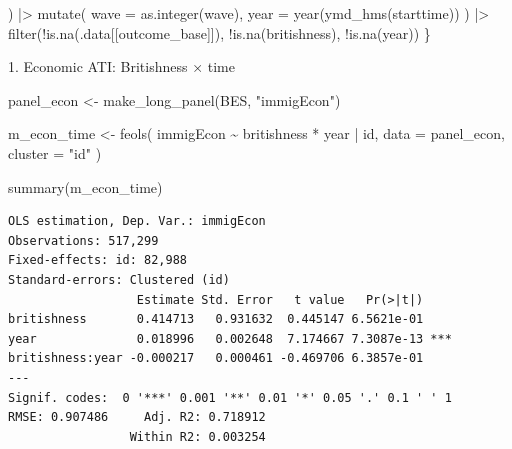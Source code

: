 \documentclass[
  11pt,
  letterpaper,
  DIV=11,
  numbers=noendperiod]{scrartcl}
\newenvironment{Shaded}{\begin{snugshade}}{\end{snugshade}}
\newcommand{\AttributeTok}[1]{\textcolor[rgb]{0.40,0.45,0.13}{#1}}
\newcommand{\FunctionTok}[1]{\textcolor[rgb]{0.28,0.35,0.67}{#1}}
\newcommand{\NormalTok}[1]{\textcolor[rgb]{0.00,0.23,0.31}{#1}}
\newcommand{\OtherTok}[1]{\textcolor[rgb]{0.00,0.23,0.31}{#1}}
\newcommand{\SpecialCharTok}[1]{\textcolor[rgb]{0.37,0.37,0.37}{#1}}
\newcommand{\StringTok}[1]{\textcolor[rgb]{0.13,0.47,0.30}{#1}}
\begin{document}
\begin{Shaded}
\begin{Highlighting}[]
\NormalTok{) }\SpecialCharTok{|\textgreater{}}
\FunctionTok{mutate}\NormalTok{(}
\AttributeTok{wave =} \FunctionTok{as.integer}\NormalTok{(wave),}
\AttributeTok{year =} \FunctionTok{year}\NormalTok{(}\FunctionTok{ymd\_hms}\NormalTok{(starttime))}
\NormalTok{) }\SpecialCharTok{|\textgreater{}}
\FunctionTok{filter}\NormalTok{(}\SpecialCharTok{!}\FunctionTok{is.na}\NormalTok{(.data[[outcome\_base]]),}
\SpecialCharTok{!}\FunctionTok{is.na}\NormalTok{(britishness),}
\SpecialCharTok{!}\FunctionTok{is.na}\NormalTok{(year))}
\NormalTok{\}}
\end{Highlighting}
\end{Shaded}

1. Economic ATI: Britishness × time

\begin{Shaded}
\begin{Highlighting}[]
\NormalTok{panel\_econ }\OtherTok{\textless{}{-}} \FunctionTok{make\_long\_panel}\NormalTok{(BES, }\StringTok{"immigEcon"}\NormalTok{)}

\NormalTok{m\_econ\_time }\OtherTok{\textless{}{-}} \FunctionTok{feols}\NormalTok{(}
\NormalTok{immigEcon }\SpecialCharTok{\textasciitilde{}}\NormalTok{ britishness }\SpecialCharTok{*}\NormalTok{ year }\SpecialCharTok{|}\NormalTok{ id,}
\AttributeTok{data =}\NormalTok{ panel\_econ,}
\AttributeTok{cluster =} \StringTok{"id"}
\NormalTok{)}

\FunctionTok{summary}\NormalTok{(m\_econ\_time)}
\end{Highlighting}
\end{Shaded}

\begin{verbatim}
OLS estimation, Dep. Var.: immigEcon
Observations: 517,299
Fixed-effects: id: 82,988
Standard-errors: Clustered (id) 
                  Estimate Std. Error   t value   Pr(>|t|)    
britishness       0.414713   0.931632  0.445147 6.5621e-01    
year              0.018996   0.002648  7.174667 7.3087e-13 ***
britishness:year -0.000217   0.000461 -0.469706 6.3857e-01    
---
Signif. codes:  0 '***' 0.001 '**' 0.01 '*' 0.05 '.' 0.1 ' ' 1
RMSE: 0.907486     Adj. R2: 0.718912
                 Within R2: 0.003254
\end{verbatim}
\end{document}
